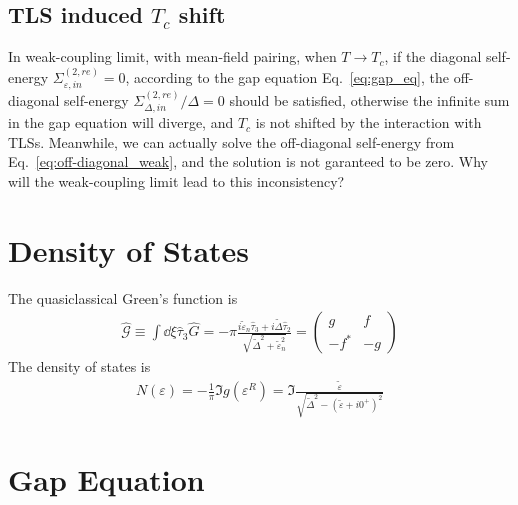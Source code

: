 \documentclass[]{article}
\begin{document}
\subsection{TLS induced $T_c$ shift}
In weak-coupling limit, with mean-field pairing, when $T \rightarrow T_c$, if the diagonal self-energy
$\Sigma_{\varepsilon,in}^{(2,re)} = 0$, according to the gap equation Eq.~\eqref{eq:gap_eq},
the off-diagonal self-energy $\Sigma_{\Delta,in}^{(2,re)}/\Delta = 0$ should be satisfied,
otherwise the infinite sum in the gap equation will diverge, and $T_c$ is not shifted by the interaction with TLSs.
Meanwhile, we can actually solve the off-diagonal self-energy from Eq.~\eqref{eq:off-diagonal_weak},
and the solution is not garanteed to be zero. Why will the weak-coupling limit lead to this inconsistency?

\section{Density of States}

The quasiclassical Green's function is
\begin{align}
    \widehat{\mathcal{G}} \equiv \int\dd\xi\widehat{\tau}_3\widehat{G}
    =-\pi\frac{i\tilde{\varepsilon}_n\widehat{\tau}_3 + i\tilde{\Delta}\widehat{\tau}_2}
    {\sqrt{\tilde{\Delta}^2 + \tilde{\varepsilon}_n^2}}
    =\begin{pmatrix}
         g    & f  \\
         -f^* & -g
     \end{pmatrix}
\end{align}
The density of states is
\begin{align}
    N(\varepsilon) = -\frac{1}{\pi}\Im{g(\varepsilon^R)}
    = \Im{\frac{\tilde{\varepsilon}}{\sqrt{\tilde{\Delta}^2 - (\tilde{\varepsilon} + i0^+)^2}}}
\end{align}

\section{Gap Equation}
\end{document}
